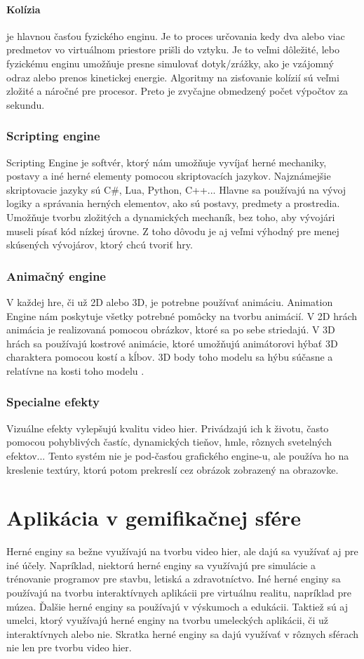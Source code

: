 \documentclass[10pt,oneside,slovak,a4paper,hidelinks]{article}
\begin{document}
			\paragraph{Kolízia} je hlavnou časťou fyzického enginu. Je to proces určovania kedy dva alebo viac predmetov vo virtuálnom priestore prišli do vztyku. Je to veľmi dôležité, lebo fyzickému enginu umožňuje presne simulovať dotyk/zrážky, ako je vzájomný odraz alebo prenos kinetickej energie. Algoritmy na zisťovanie kolízií sú veľmi zložité a náročné pre procesor. Preto je zvyčajne obmedzený počet výpočtov za sekundu.
		\subsubsection{Scripting engine}
			Scripting Engine je softvér, ktorý nám umožňuje vyvíjať herné mechaniky, postavy a iné herné elementy pomocou skriptovacích jazykov. Najznámejšie skriptovacie jazyky sú C\#, Lua, Python, C++... Hlavne sa používajú na vývoj logiky a správania herných elementov, ako sú postavy, predmety a prostredia. Umožňuje tvorbu zložitých a dynamických mechaník, bez toho, aby vývojári museli písať kód nízkej úrovne. Z toho dôvodu je aj veľmi výhodný pre menej skúsených vývojárov, ktorý chcú tvoriť hry.
		\subsubsection{Animačný engine}
			V každej hre, či už 2D alebo 3D, je potrebne používať animáciu. Animation Engine nám poskytuje všetky potrebné pomôcky na tvorbu animácií. V 2D hrách animácia je realizovaná pomocou obrázkov, ktoré sa po sebe striedajú. V 3D hrách sa používajú kostrové animácie, ktoré umožňujú animátorovi hýbať 3D charaktera pomocou kostí a kĺbov. 3D body toho modelu sa hýbu súčasne a relatívne na kosti toho modelu \cite{Secondary}.
		\subsubsection{Specialne efekty}
			Vizuálne efekty vylepšujú kvalitu video hier. Privádzajú ich k životu, často pomocou pohyblivých častíc, dynamických tieňov, hmle, rôznych svetelných efektov... Tento systém nie je pod-časťou grafického engine-u, ale používa ho na kreslenie textúry, ktorú potom prekreslí cez obrázok zobrazený na obrazovke.
	\section{Aplikácia v gemifikačnej sfére}
		Herné enginy sa bežne využívajú na tvorbu video hier, ale dajú sa využívať aj pre iné účely. Napríklad, niektorú herné enginy sa využívajú pre simulácie a trénovanie programov pre stavbu, letiská a zdravotníctvo. Iné herné enginy sa používajú na tvorbu interaktívnych aplikácii pre virtuálnu realitu, napríklad pre múzea. Ďalšie herné enginy sa používajú v výskumoch a edukácii. Taktiež sú aj umelci, ktorý využívajú herné enginy na tvorbu umeleckých aplikácii, či už interaktívnych alebo nie. Skratka herné enginy sa dajú využívať v rôznych sférach nie len pre tvorbu video hier.
\end{document}
